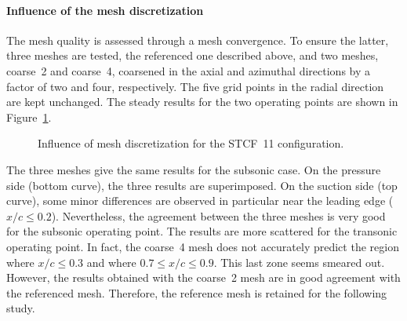 \paragraph{Influence of the mesh discretization}
\label{sub:stcf11_mesh_convergence}
The mesh quality is assessed through a mesh convergence.
To ensure the latter, three meshes are tested, the referenced one
described above, and two meshes, coarse~2 and coarse~4,
coarsened in the axial and
azimuthal directions by a factor of two and four, respectively. 
The five grid points in the radial direction
are kept unchanged.
The steady results for the two operating points are shown 
in Figure~\ref{fig:stcf11_mesh_convergence}.
\begin{figure}[htp]
  \centering
  \caption{Influence of mesh discretization for the STCF~11 configuration.}
  \label{fig:stcf11_mesh_convergence}
\end{figure}
The three meshes give the same results for the subsonic case. On the
pressure side (bottom curve), the three results are superimposed. On the suction side
(top curve),
some minor differences are observed in particular near the leading edge
($x / c \leq 0.2$). Nevertheless, the agreement
between the three meshes is very good for the subsonic operating point.
The results are more scattered for the transonic operating point. In fact,
the coarse~4 mesh does not accurately predict the region where $x / c \leq 0.3$
and where $0.7 \leq x / c \leq 0.9$. This last zone seems smeared out. 
However, the results
obtained with the coarse~2 mesh are in good agreement with the referenced mesh.
Therefore, the reference mesh is retained for the following study.

